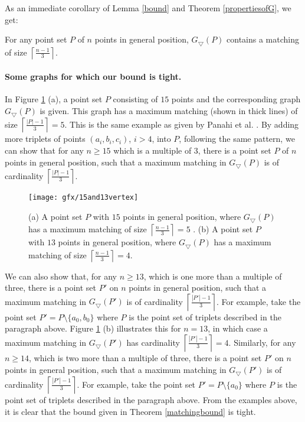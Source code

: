 As an immediate corollary of Lemma \ref{bound} and Theorem \ref{propertiesofG}, we get:
\begin{theorem}\label{matchingbound}
 For any point set $P$ of $n$ points in general position, $G_\bigtriangledown(P)$ contains a matching of size $\left\lceil\frac{n-1}{3}\right\rceil$.
\end{theorem}
\paragraph{Some graphs for which our bound is tight.} In Figure \ref{fig15and13vertex} (a), a point set $P$ consisting of $15$ points and the 
corresponding graph $G_\bigtriangledown(P)$ is given. This graph has a maximum matching (shown in thick lines) of size 
$\left\lceil\frac{|P|-1}{3}\right\rceil =5$. This is the same example as given by Panahi et al. \cite{Panahi}. By adding more triplets of 
points $(a_i, b_i, c_i)$, $i>4$, into $P$, following the same pattern, we can show that for any $n\ge 15$ which is a multiple of $3$, there is 
a point set $P$ of $n$ points in general position, such that a maximum matching in $G_\bigtriangledown(P)$ is of cardinality 
$\left\lceil\frac{|P|-1}{3}\right\rceil$.
\begin{figure}[h]
  \centering
  \texttt{[image: gfx/15and13vertex]}   %
  \caption[Tight examples]{(a) A point set $P$ with $15$ points in general position, where $G_\bigtriangledown(P)$ has a maximum matching of size 
$\left\lceil\frac{n-1}{3}\right\rceil = 5$ \cite{Panahi}. (b) A point set $P$ with $13$ points in general position, where 
$G_\bigtriangledown(P)$ has a maximum matching of size $\left\lceil\frac{n-1}{3}\right\rceil = 4$.}
\label{fig15and13vertex}
  \end{figure} 
We can also show that, for any $n \ge 13$, which is one more than a multiple of three, there is a point set $P'$ on $n$ points in general position, 
such that a maximum matching in $G_\bigtriangledown(P')$ is of cardinality $\left \lceil\frac{|P'|-1}{3}\right\rceil$. For example, take the point 
set $P'=P \setminus \{a_0, b_0\}$ where $P$ is the point set of triplets described in the paragraph above. Figure \ref{fig15and13vertex} 
(b) illustrates this for $n=13$, in which case a maximum matching in $G_\bigtriangledown(P')$ has 
cardinality $\left \lceil\frac{|P'|-1}{3}\right\rceil = 4$. Similarly, for any $n\ge 14$, which is two more than a multiple of three, 
there is a point set $P'$ on $n$ points in general position, such that a maximum matching in $G_\bigtriangledown(P')$ is of 
cardinality $\left \lceil\frac{|P'|-1}{3}\right\rceil$. For example, take the point set $P'=P \setminus \{a_0\}$ where $P$ is the point 
set of triplets described in the paragraph above. From the examples above, it is clear that the bound given in Theorem \ref{matchingbound} is tight.
